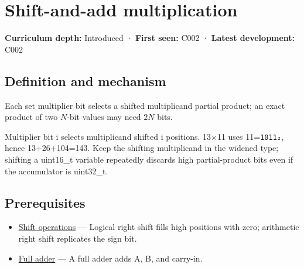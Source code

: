 \hypertarget{appendix-a65290d66ed9}{}\label{referencestart:appendix-a65290d66ed9}
\section{Shift-and-add multiplication}\label{appendix-a65290d66ed9-shift-and-add-multiplication}

\hypertarget{appendix-a65290d66ed9-shift-and-add-multiplication}{}

\textbf{Curriculum depth:} Introduced · \textbf{First seen:} C002 · \textbf{Latest development:} C002

\begin{allmightroledefinition}

\subsection{Definition and mechanism}\label{appendix-a65290d66ed9-definition-and-mechanism}

\hypertarget{appendix-a65290d66ed9-definition-and-mechanism}{}

Each set multiplier bit selects a shifted multiplicand partial product; an exact product of two \(N\)-bit values may need \(2N\) bits.

\end{allmightroledefinition}

Multiplier bit i selects multiplicand shifted i positions. 13×11 uses 11=\texttt{1011₂}, hence 13+26+104=143. Keep the shifting multiplicand in the widened type; shifting a uint16\_t variable repeatedly discards high partial-product bits even if the accumulator is uint32\_t.

\subsection{Prerequisites}\label{appendix-a65290d66ed9-prerequisites}

\hypertarget{appendix-a65290d66ed9-prerequisites}{}

\begin{itemize}
\tightlist
\item
  \hyperref[appendix-73425b25118e]{Shift operations} --- Logical right shift fills high positions with zero; arithmetic right shift replicates the sign bit.
\item
  \hyperref[appendix-d1a5b1e520c2]{Full adder} --- A full adder adds A, B, and carry-in.
\end{itemize}

